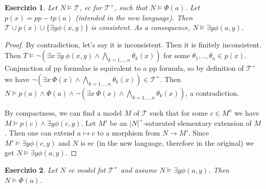 \documentclass{article}
\newtheorem{exercise}{Esercizio}
\begin{document}
\begin{exercise}

	Let $N \models \mathcal{T}$, ec for $\mathcal{T}^+$, such that $N \models \Phi(a)$. 
	Let $p(x) = pp-tp(a)$ (intended in the new language). Then $\mathcal{T} \cup p(x) \cup \{\exists y \phi(x,y) \}$ is consistent.
	As a consequence, $N \models \exists y \phi(a,y)$.
\end{exercise}

\begin{proof}

	By contradiction, let's say it is inconsistent. Then it is finitely inconsistent.
	Then $T \models \neg (\exists x \ \exists y \ \phi(x,y) \land \bigwedge_{k=1,..,n} \theta_k(x) )$ for some $\theta_1,..,\theta_n \in p(x)$.
	Conjunction of pp formulae is equivalent to a pp formula, so by definition of $\mathcal{T}^+$ we have 
	$\neg (\exists x \ \Phi(x) \land \bigwedge_{k=1,..,n} \theta_k(x) ) \in \mathcal{T}^+$.
	Then $N \models p(a) \land \Phi(a) \land \neg (\exists x \ \Phi(x) \land \bigwedge_{k=1,..,n} \theta_k(x))$, a contradiction.

	By compactness, we can find a model $M$ of $\mathcal{T}$ such that for some $c \in M^x$ we have $M \models p(c) \land \exists y \phi(c,y)$.
	Let $M'$ be an $|N|^+$-saturated elementary extension of $M$. 
	Then one can extend $a \mapsto c$ to a morphism from $N \to M'$.
	Since $M' \models \exists y \phi(c,y)$ and $N$ is ec (in the new language, therefore in the original) we get $N \models \exists y \phi(a,y)$.

\end{proof}




\begin{exercise}

	Let $N$ ec model fot $\mathcal{T}^+$ and assume $N \models \exists y \phi(a,y)$. Then $N \models \Phi(a)$.

\end{exercise}
\end{document}
